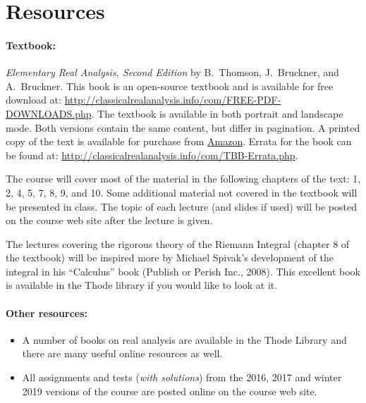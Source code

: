 \documentclass[12pt]{article}
\begin{document}
\section*{Resources}

\paragraph*{Textbook: } \emph{Elementary Real Analysis, Second Edition} by B.\ Thomson, J.\ Bruckner, and A.\ Bruckner.  This book is an open-source textbook and is available for free download at: \url{http://classicalrealanalysis.info/com/FREE-PDF-DOWNLOADS.php}.  The textbook is available in both portrait and landscape mode.  Both versions contain the same content, but differ in pagination.  A printed copy of the text is available for purchase from \href{https://www.amazon.ca/Elementary-Real-Analysis-Brian-Thomson/dp/143484367X/}{Amazon}.  Errata for the book can be found at: \url{http://classicalrealanalysis.info/com/TBB-Errata.php}.

The course will cover most of the material in the following chapters of the text: 1, 2, 4, 5, 7, 8, 9, and 10.  Some additional material not covered in the textbook will be presented in class.  The topic of each lecture (and slides if used) will be posted on the course web site after the lecture is given.

The lectures covering the rigorous theory of the Riemann Integral (chapter 8 of the textbook) will be inspired more by Michael Spivak's development of the integral in his ``Calculus'' book (Publish or Perish Inc., 2008).  This excellent book is available in the Thode library if you would like to look at it.

\paragraph*{Other resources:} 
\begin{itemize}
\item A number of books on real analysis are available in the Thode Library and there are many useful online resources as well.
\item All assignments and tests (\emph{with solutions}) from the 2016,
  2017 and winter 2019 versions of the course are posted online on the course web site.
\end{itemize}
\end{document}
